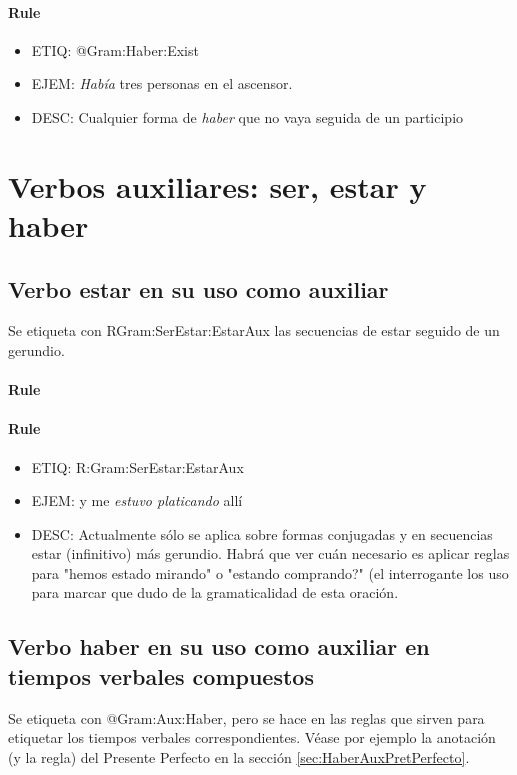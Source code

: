\documentclass[11pt]{report}
\begin{document}
\paragraph*{Rule}
\begin{itemize}
\item ETIQ: @Gram:Haber:Exist
\item EJEM: \emph{Había} tres personas en el ascensor. 
\item DESC: Cualquier forma de \emph{haber} que no vaya seguida de un participio
\end{itemize}

\section{Verbos auxiliares: ser, estar y haber}
\subsection{Verbo estar en su uso como auxiliar}
Se etiqueta con RGram:SerEstar:EstarAux las secuencias de estar seguido de un gerundio.

\paragraph*{Rule}
\paragraph*{Rule}
\begin{itemize}
\item ETIQ: R:Gram:SerEstar:EstarAux
\item EJEM: y me \emph{estuvo platicando} allí
\item DESC: Actualmente sólo se aplica sobre formas conjugadas y en secuencias estar (infinitivo) más gerundio. Habrá que ver cuán necesario es aplicar reglas para "hemos estado mirando" o "estando comprando?" (el interrogante los uso para marcar que dudo de la gramaticalidad de esta oración.
\end{itemize}

\subsection{Verbo haber en su uso como auxiliar en tiempos verbales compuestos}
Se etiqueta con @Gram:Aux:Haber, pero se hace en las reglas que sirven para etiquetar los tiempos verbales correspondientes. Véase por ejemplo la anotación (y la regla) del Presente Perfecto en la sección \ref{sec:HaberAuxPretPerfecto}. 
\end{document}
